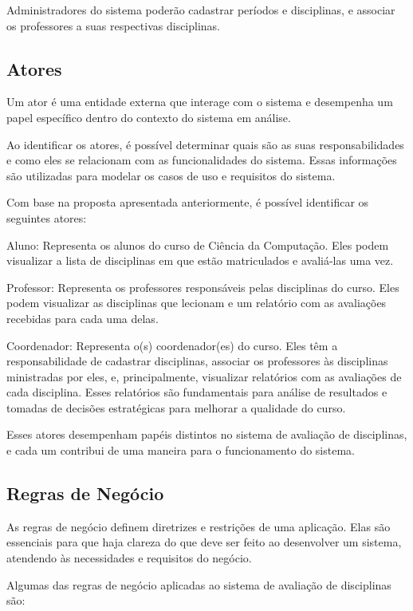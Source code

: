Administradores do sistema poderão cadastrar períodos e disciplinas, e associar os professores a suas respectivas disciplinas. 

\subsection{Atores}
Um ator é uma entidade externa que interage com o sistema e desempenha um papel específico dentro do contexto do sistema em análise.

Ao identificar os atores, é possível determinar quais são as suas responsabilidades e como eles se relacionam com as funcionalidades do sistema. Essas informações são utilizadas para modelar os casos de uso e requisitos do sistema.

Com base na proposta apresentada anteriormente, é possível identificar os seguintes atores:

\begin{alineas}
  \item Aluno: Representa os alunos do curso de Ciência da Computação. Eles podem visualizar a lista de disciplinas em que estão matriculados e avaliá-las uma vez.
  \item Professor: Representa os professores responsáveis pelas disciplinas do curso. Eles podem visualizar as disciplinas que lecionam e um relatório com as avaliações recebidas para cada uma delas.
  \item Coordenador: Representa o(s) coordenador(es) do curso. Eles têm a responsabilidade de cadastrar disciplinas, associar os professores às disciplinas ministradas por eles, e, principalmente, visualizar relatórios com as avaliações de cada disciplina. Esses relatórios são fundamentais para análise de resultados e tomadas de decisões estratégicas para melhorar a qualidade do curso.
\end{alineas}

Esses atores desempenham papéis distintos no sistema de avaliação de disciplinas, e cada um contribui de uma maneira para o funcionamento do sistema.

\subsection{Regras de Negócio}
As regras de negócio definem diretrizes e restrições de uma aplicação. Elas são essenciais para que haja clareza do que deve ser feito ao desenvolver um sistema, atendendo às necessidades e requisitos do negócio.

Algumas das regras de negócio aplicadas ao sistema de avaliação de disciplinas são:

